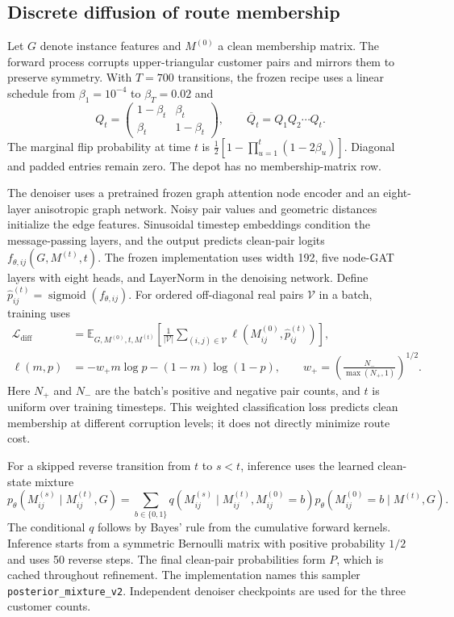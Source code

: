 \documentclass[11pt,a4paper]{article}
\newcommand{\Expect}{\mathbb{E}}
\begin{document}
\subsection{Discrete diffusion of route membership}

Let $G$ denote instance features and $M^{(0)}$ a clean membership matrix.
The forward process corrupts upper-triangular customer pairs and mirrors
them to preserve symmetry. With $T=700$ transitions, the frozen recipe
uses a linear schedule from $\beta_1=10^{-4}$ to $\beta_T=0.02$ and
\begin{equation}
 Q_t=\begin{pmatrix}1-\beta_t&\beta_t\\
                    \beta_t&1-\beta_t\end{pmatrix},
 \qquad \overline Q_t=Q_1Q_2\cdots Q_t.
 \label{eq:forward-diffusion}
\end{equation}
The marginal flip probability at time $t$ is
$\tfrac12[1-\prod_{u=1}^{t}(1-2\beta_u)]$. Diagonal and padded entries
remain zero. The depot has no membership-matrix row.

The denoiser uses a pretrained frozen graph attention node encoder and
an eight-layer anisotropic graph network. Noisy pair values and geometric
distances initialize the edge features. Sinusoidal timestep embeddings
condition the message-passing layers, and the output predicts clean-pair
logits $f_{\theta,ij}(G,M^{(t)},t)$. The frozen implementation uses width
192, five node-GAT layers with eight heads, and LayerNorm in the denoising
network. Define $\widehat p_{ij}^{(t)}=\operatorname{sigmoid}(f_{\theta,ij})$.
For ordered off-diagonal real pairs $\mathcal V$ in a batch, training uses
\begin{align}
 \mathcal L_{\mathrm{diff}}
 &=\Expect_{G,M^{(0)},t,M^{(t)}}\left[
   \frac{1}{|\mathcal V|}\sum_{(i,j)\in\mathcal V}
   \ell(M_{ij}^{(0)},\widehat p_{ij}^{(t)})\right],\\
 \ell(m,p)&=-w_+m\log p-(1-m)\log(1-p),
 \qquad w_+=\left(\frac{N_-}{\max(N_+,1)}\right)^{1/2}.
 \label{eq:diffusion-loss}
\end{align}
Here $N_+$ and $N_-$ are the batch's positive and negative pair counts,
and $t$ is uniform over training timesteps. This weighted classification
loss predicts clean membership at different corruption levels; it does
not directly minimize route cost.

For a skipped reverse transition from $t$ to $s<t$, inference uses the
learned clean-state mixture
\begin{equation}
 p_\theta(M_{ij}^{(s)}\mid M_{ij}^{(t)},G)=
 \sum_{b\in\{0,1\}}
 q(M_{ij}^{(s)}\mid M_{ij}^{(t)},M_{ij}^{(0)}=b)
 p_\theta(M_{ij}^{(0)}=b\mid M^{(t)},G).
 \label{eq:reverse-mixture}
\end{equation}
The conditional $q$ follows by Bayes' rule from the cumulative forward
kernels. Inference starts from a symmetric Bernoulli matrix with positive
probability $1/2$ and uses 50 reverse steps. The final clean-pair
probabilities form $P$, which is cached throughout refinement. The
implementation names this sampler \texttt{posterior\_mixture\_v2}.
Independent denoiser checkpoints are used for the three customer counts.
\end{document}

